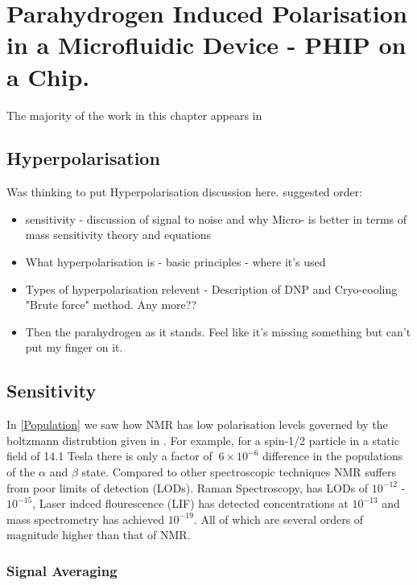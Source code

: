 
\chapter{Parahydrogen Induced Polarisation in a Microfluidic Device - PHIP on a Chip.}

The majority of the work in this chapter appears in \citep{eills2019high}

\section{Hyperpolarisation}

Was thinking to put Hyperpolarisation discussion here.
suggested order:
\begin{itemize}
  \item sensitivity - discussion of signal to noise and why Micro- is better in terms of mass
  sensitivity theory and equations
  \item What hyperpolarisation is - basic principles - where it's used
  \item Types of hyperpolarisation relevent - Description of DNP and Cryo-cooling "Brute force" method. Any more??
  \item Then the parahydrogen as it stands. Feel like it's missing something but can't put my finger on it.
\end{itemize}

\section{Sensitivity}\label{Sensitivity}

In \ref{Population} we saw how NMR has low polarisation levels governed by the boltzmann
distrubtion given in . For example, for a spin-1/2 particle in a static field of 14.1 Tesla
there is only a factor of $~6\times10^{-6}$ difference in the populations of the $\alpha$ and $\beta$ state.
Compared to other spectroscopic techniques NMR suffers from poor limits of detection (LODs). Raman Spectroscopy, has
LODs of $10^{-12}$ - $10^{-15}$, Laser indced flourescence (LIF) has detected concentrations at $10^{-13}$ and
mass spectrometry has achieved $10^{-19}$. All of which are several orders of magnitude higher than that of NMR.

\subsection{Signal Averaging}

